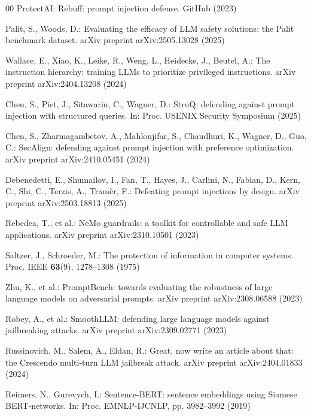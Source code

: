 \documentclass[runningheads]{llncs}
\newif\ifrev
\newcommand{\rev}[1]{\ifrev\hl{#1}\else#1\fi}                  %
\begin{document}
\begin{thebibliography}{00}
ProtectAI: Rebuff: prompt injection defense. GitHub (2023)

Palit, S., Woods, D.: Evaluating the efficacy of LLM safety solutions: the Palit benchmark dataset. arXiv preprint arXiv:2505.13028 (2025)

\rev{Wallace, E., Xiao, K., Leike, R., Weng, L., Heidecke, J., Beutel, A.: The instruction hierarchy: training LLMs to prioritize privileged instructions. arXiv preprint arXiv:2404.13208 (2024)}

\rev{Chen, S., Piet, J., Sitawarin, C., Wagner, D.: StruQ: defending against prompt injection with structured queries. In: Proc. USENIX Security Symposium (2025)}

\rev{Chen, S., Zharmagambetov, A., Mahloujifar, S., Chaudhuri, K., Wagner, D., Guo, C.: SecAlign: defending against prompt injection with preference optimization. arXiv preprint arXiv:2410.05451 (2024)}

\rev{Debenedetti, E., Shumailov, I., Fan, T., Hayes, J., Carlini, N., Fabian, D., Kern, C., Shi, C., Terzis, A., Tram\`{e}r, F.: Defeating prompt injections by design. arXiv preprint arXiv:2503.18813 (2025)}

Rebedea, T., et al.: NeMo guardrails: a toolkit for controllable and safe LLM applications. arXiv preprint arXiv:2310.10501 (2023)


Saltzer, J., Schroeder, M.: The protection of information in computer systems. Proc. IEEE \textbf{63}(9), 1278--1308 (1975)

Zhu, K., et al.: PromptBench: towards evaluating the robustness of large language models on adversarial prompts. arXiv preprint arXiv:2308.06588 (2023)

Robey, A., et al.: SmoothLLM: defending large language models against jailbreaking attacks. arXiv preprint arXiv:2309.02771 (2023)

Russinovich, M., Salem, A., Eldan, R.: Great, now write an article about that: the Crescendo multi-turn LLM jailbreak attack. arXiv preprint arXiv:2404.01833 (2024)

Reimers, N., Gurevych, I.: Sentence-BERT: sentence embeddings using Siamese BERT-networks. In: Proc. EMNLP-IJCNLP, pp. 3982--3992 (2019)


\end{thebibliography}
\end{document}
